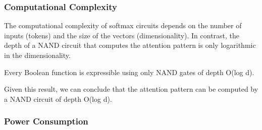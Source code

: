 \subsubsection{Computational Complexity}













The computational complexity of softmax circuits depends on the number of inputs (tokens) and the size of the vectors (dimensionality). In contrast, the depth of a NAND circuit that computes the attention pattern is only logarithmic in the dimensionality.













\begin{theorem}






Every Boolean function is expressible using only NAND gates of depth O(log d).






\end{theorem}













Given this result, we can conclude that the attention pattern can be computed by a NAND circuit of depth O(log d).













\subsubsection{Power Consumption}














